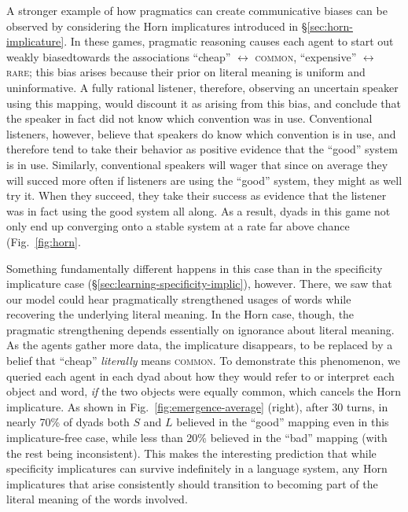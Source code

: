 \documentclass{article} %
\begin{document}
A stronger example of how pragmatics can create communicative biases can be
observed by considering the Horn implicatures introduced in \S\ref{sec:horn-implicature}. 
In these games, pragmatic reasoning causes each agent to start out weakly biasedtowards the associations ``cheap'' $\leftrightarrow$
\textsc{common}, ``expensive'' $\leftrightarrow$ \textsc{rare}; this bias arises because their prior on literal meaning
is uniform and uninformative. A fully rational listener, therefore,
observing an uncertain speaker using this mapping, would discount it
as arising from this bias, and conclude that the speaker in fact did
not know which convention was in use. Conventional listeners,
however, believe that speakers do know which convention is in
use, and therefore tend to take their behavior as positive evidence that the
``good'' system is in use. Similarly, conventional speakers
will wager that since on average they will succed more often if
listeners are using the ``good'' system, they might as well try
it. When they succeed, they take their success as evidence that the listener was in
fact using the good system all along. As a result, dyads in this game
not only end up converging onto a stable system at a rate far above
chance (Fig.~\ref{fig:horn}. 

Something
fundamentally different happens in this case than in the specificity
implicature case (\S\ref{sec:learning-specificity-implic}), however. There, we
saw that our model could hear pragmatically strengthened usages
of words while recovering the underlying literal meaning. In the Horn
case, though, the pragmatic strengthening depends essentially on
ignorance about literal meaning. As the agents gather more data,
the implicature disappears, to be replaced by a belief that
``cheap'' \textit{literally} means \textsc{common}. To demonstrate
this phenomenon, we queried each agent in each dyad about how they would refer to
or interpret each object and word, \textit{if} the two objects were
equally common, which cancels the Horn implicature. As shown in
Fig.~\ref{fig:emergence-average} (right), after 30 turns, in nearly 70\%
of dyads both $S$ and $L$ believed in the ``good'' mapping even in
this implicature-free case, while less than 20\% believed in the
``bad'' mapping (with the rest being inconsistent). This makes the
interesting prediction that while specificity implicatures can survive
indefinitely in a language system, any Horn implicatures that arise
consistently should transition to becoming part of the literal meaning
of the words involved.
\end{document}
